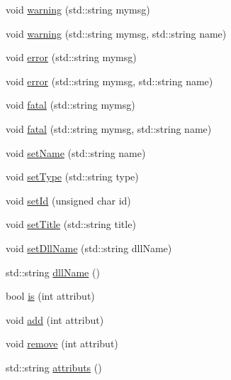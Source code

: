 \begin{DoxyCompactItemize}
\item 
void \hyperlink{classObject_a65cd4fda577711660821fd2cd5a3b4c9}{warning} (std::string mymsg)
\item 
void \hyperlink{classObject_a11f101db4dd73d9391b0231818881d86}{warning} (std::string mymsg, std::string name)
\item 
void \hyperlink{classObject_a204a95f57818c0f811933917a30eff45}{error} (std::string mymsg)
\item 
void \hyperlink{classObject_ad7f6c457733082efa2f9ff5f5c8e119a}{error} (std::string mymsg, std::string name)
\item 
void \hyperlink{classObject_aad5a16aac7516ce65bd5ec02ab07fc80}{fatal} (std::string mymsg)
\item 
void \hyperlink{classObject_ae62acd3d09f716220f75f252dc38bc9a}{fatal} (std::string mymsg, std::string name)
\item 
void \hyperlink{classObject_ae30fea75683c2d149b6b6d17c09ecd0c}{setName} (std::string name)
\item 
void \hyperlink{classObject_aae534cc9d982bcb9b99fd505f2e103a5}{setType} (std::string type)
\item 
void \hyperlink{classObject_a398fe08cba594a0ce6891d59fe4f159f}{setId} (unsigned char id)
\item 
void \hyperlink{classObject_a89557dbbad5bcaa02652f5d7fa35d20f}{setTitle} (std::string title)
\item 
void \hyperlink{classObject_a870c5af919958c2136623b2d7816d123}{setDllName} (std::string dllName)
\item 
std::string \hyperlink{classObject_a2e3947f2870094c332d7454117f3ec63}{dllName} ()
\item 
bool \hyperlink{classAttrib_a704f26af560909ad22065083bb7d4c34}{is} (int attribut)
\item 
void \hyperlink{classAttrib_a235f773af19c900264a190b00a3b4ad7}{add} (int attribut)
\item 
void \hyperlink{classAttrib_a7d4ef7e32d93cb287792b87b857e79f3}{remove} (int attribut)
\item 
std::string \hyperlink{classAttrib_aee7bbf16b144887f196e1341b24f8a26}{attributs} ()
\end{DoxyCompactItemize}
